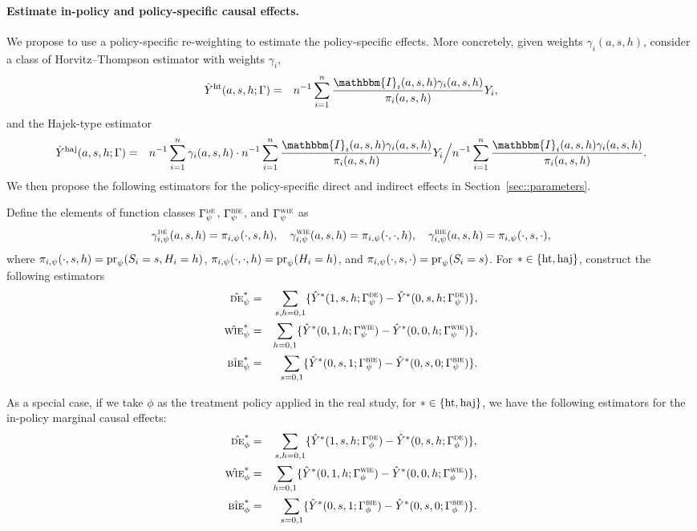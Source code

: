 \documentclass{article}
\newcommand{\pr}{\textup{pr}}
\newcommand{\sumi}{\sum_{i=1}^n}
\newcommand{\de}{\textsc{de}}
\newcommand{\bie}{\textsc{bie}}
\newcommand{\wie}{\textsc{wie}}
\newcommand{\horthom}{\textup{ht}}
\newcommand{\haj}{\textup{haj}}
\newcommand{\bbI}{\mathbbm{I}}
\newcommand{\pscore}[1]{\pi_{#1}}
\begin{document}
\paragraph{Estimate in-policy and policy-specific causal effects.}
We propose to use a policy-specific re-weighting to estimate the policy-specific effects. More concretely, given weights $\gamma_i(a,s,h)$, consider a class of Horvitz--Thompson estimator with weights $\gamma_i$,
\begin{eqnarray*}
    \hat{Y}^{\horthom}(a,s,h;\Gamma) &=& n^{-1}\sumi\frac{ \bbI_{i}(a,s,h)\gamma_i(a,s,h)}{ \pscore{i}(a,s,h)}Y_{i},
\end{eqnarray*}
and the Hajek-type estimator
\begin{eqnarray*}
    \hat{Y}^{\haj}(a,s,h;\Gamma) &=& n^{-1}\sumi \gamma_i(a,s,h)\cdot n^{-1}\sumi\frac{ \bbI_{i}(a,s,h) \gamma_i(a,s,h)}{ \pscore{i}(a,s,h)}Y_{i} \Big / n^{-1}\sumi\frac{ \bbI_{i}(a,s,h) \gamma_i(a,s,h)}{ \pscore{i}(a,s,h)}. 
\end{eqnarray*}
We then propose the following estimators for the policy-specific direct and indirect effects in Section~\ref{sec::parameters}. 

Define the elements of function classes $\Gamma_{\psi}^{\de}$, $\Gamma_{\psi}^{\bie}$, and $\Gamma_{\psi}^{\wie}$ as
\begin{equation*}
    \gamma_{i,\psi}^{\de}(a,s,h) = \pscore{i,\psi}(\cdot,s,h), \quad 
    \gamma_{i,\psi}^{\wie}(a,s,h) = \pscore{i,\psi}(\cdot, \cdot, h), \quad
    \gamma_{i,\psi}^{\bie}(a,s,h) = \pscore{i,\psi}(\cdot, s, \cdot),
\end{equation*}
where $\pscore{i,\psi}(\cdot,s,h)=\pr_{\psi}(S_i=s,H_i=h)$, $\pscore{i,\psi}(\cdot, \cdot, h) = \pr_{\psi}(H_i=h)$, and $\pscore{i,\psi}(\cdot, s, \cdot)=\pr_{\psi}(S_i=s)$. For $*\in\{\horthom,\haj\}$, construct the following estimators
\begin{eqnarray*}
    \hat{\de}_{\psi}^{*} &=& \sum_{s,h=0,1} \{\hat{Y}^{*}(1,s,h;\Gamma_{\psi}^{\de})  - \hat{Y}^{*}(0,s,h;\Gamma_{\psi}^{\de})\}, \\
    \hat{\wie}_{\psi}^{*} &=& \sum_{h=0,1} \{\hat{Y}^{*}(0,1,h;\Gamma_{\psi}^{\wie}) - \hat{Y}^{*}(0,0,h;\Gamma_{\psi}^{\wie})\}, \\
    \hat{\bie}_{\psi}^{*} &=& \sum_{s=0,1} \{\hat{Y}^{*}(0,s,1;\Gamma_{\psi}^{\bie}) - \hat{Y}^{*}(0,s,0;\Gamma_{\psi}^{\bie})\}.
\end{eqnarray*}

As a special case, if we take $\phi$ as the treatment policy applied in the real study, 
for $*\in\{\horthom,\haj\}$, we have the following estimators for the in-policy marginal causal effects:
\begin{eqnarray*}
    \hat{\de}_{\phi}^{*} &=& \sum_{s,h=0,1} \{\hat{Y}^{*}(1,s,h;\Gamma_{\phi}^{\de})  - \hat{Y}^{*}(0,s,h;\Gamma_{\phi}^{\de})\}, \\
    \hat{\wie}_{\phi}^{*} &=& \sum_{h=0,1} \{\hat{Y}^{*}(0,1,h;\Gamma_{\phi}^{\wie}) - \hat{Y}^{*}(0,0,h;\Gamma_{\phi}^{\wie})\}, \\
    \hat{\bie}_{\phi}^{*} &=& \sum_{s=0,1} \{\hat{Y}^{*}(0,s,1;\Gamma_{\phi}^{\bie}) - \hat{Y}^{*}(0,s,0;\Gamma_{\phi}^{\bie})\}.
\end{eqnarray*}
\end{document}
